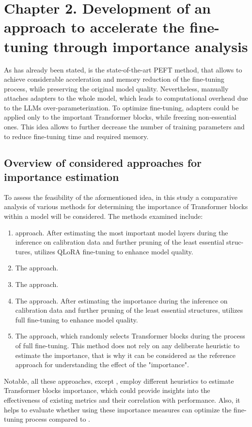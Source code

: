 \section*{Chapter 2. Development of an approach to accelerate the fine-tuning through importance analysis}
\setcounter{section}{2}
As has already been stated, \lora{} is the state-of-the-art PEFT method, that allows to achieve considerable acceleration and memory reduction of the fine-tuning process, while preserving the original model quality. Nevertheless, \lora{} manually attaches adapters to the whole model, which leads to computational overhead due to the LLMs over-parameterization. To optimize \lora{} fine-tuning, adapters could be applied only to the important Transformer blocks, while freezing non-essential ones. This idea allows to further decrease the number of training parameters and to reduce fine-tuning time and required memory. 

\subsection{Overview of considered approaches for importance estimation}
To assess the feasibility of the aformentioned idea, in this study a comparative analysis of various methods for determining the importance of Transformer blocks within a model will be considered. The methods examined include:
\begin{enumerate}
    \item \uidl{} \cite{uidl} approach. After estimating the most important model layers during the inference on calibration data and further pruning of the least essential struc-tures, \uidl{} utilizes QLoRA fine-tuning to enhance model quality. 
    \item The \sleb{} \cite{sleb} approach.
    \item The \shortllama{} \cite{kim2024shortenedllamadepthpruning} approach. 
    \item The \ows{} \cite{ows} approach. After estimating the importance during the inference on calibration data and further pruning of the least essential structures, \ows{} utilizes full fine-tuning to enhance model quality.
    \item The \lisa{} \cite{lisa} approach, which randomly selects Transformer blocks during the process of full fine-tuning. This method does not rely on any deliberate heuristic to estimate the importance, that is why it can be considered as the reference approach for understanding the effect of the "importance". 
\end{enumerate}
Notable, all these approaches, except \lisa{}, employ different heuristics to estimate Transformer blocks importance, which could provide insights into the effectiveness of existing metrics and their correlation with \llm{} performance. Also, it helps to evaluate whether using these importance measures can optimize the fine-tuning process compared to \lora{}.

